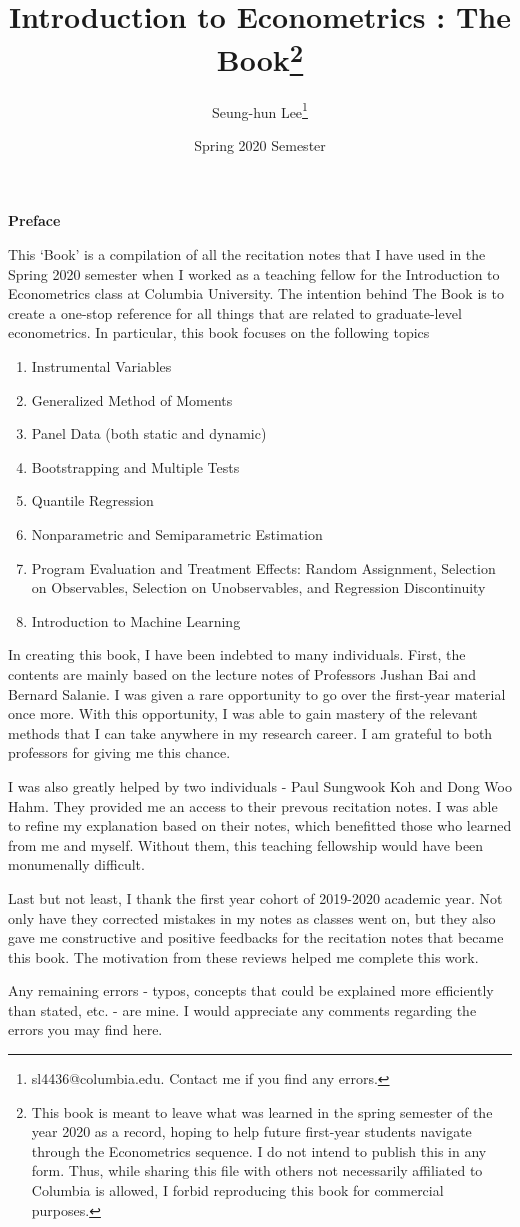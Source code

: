 \documentclass[12pt]{book}
\title{Introduction to Econometrics \ROM{2}: The Book\footnote{This book is meant to leave what was learned in the spring semester of the year 2020 as a record, hoping to help future first-year students navigate through the Econometrics sequence. I do not intend to publish this in any form. Thus, while sharing this file with others not necessarily affiliated to Columbia is allowed, I forbid reproducing this book for commercial purposes.}}
\date{Spring 2020 Semester}
\author{Seung-hun Lee\footnote{sl4436@columbia.edu. Contact me if you find any errors. }}
\theoremstyle{definition}
\theoremstyle{property}
\theoremstyle{assumption}
\theoremstyle{example}
\theoremstyle{comment}
\newcommand{\ROM}[1]
    {\MakeUppercase{\romannumeral #1}}
\newcommand{\prefacename}{Preface}
\newenvironment{preface}{
        \vspace*{\stretch{2}}
        {\noindent \bfseries \Huge \prefacename}
        \begin{center}
            \thispagestyle{plain}
        \end{center}%
    }
    {\vspace*{\stretch{5}}}
\begin{document}
\linespread{1.25}
\onehalfspacing
\maketitle
\pagestyle{empty}

\frontmatter
{}

\begin{preface}
This `Book' is a compilation of all the recitation notes that I have used in the Spring 2020 semester when I worked as a teaching fellow for the Introduction to Econometrics \ROM{2} class at Columbia University. The intention behind The Book is to create a one-stop reference for all things that are related to graduate-level econometrics.  In particular, this book focuses on the following topics
\begin{enumerate}
\item Instrumental Variables
\item Generalized Method of Moments
\item Panel Data (both static and dynamic)
\item Bootstrapping and Multiple Tests
\item Quantile Regression
\item Nonparametric and Semiparametric Estimation
\item Program Evaluation and Treatment Effects: Random Assignment, Selection on Observables, Selection on Unobservables, and Regression Discontinuity
\item Introduction to Machine Learning
\end{enumerate}
\par
In creating this book, I have been indebted to many individuals. First, the contents are mainly based on the lecture notes of Professors Jushan Bai and Bernard Salanie. I was given a rare opportunity to go over the first-year material once more. With this opportunity, I was able to gain mastery of the relevant methods that I can take anywhere in my research career. I am grateful to both professors for giving me this chance. 
\par
I was also greatly helped by two individuals - Paul Sungwook Koh and Dong Woo Hahm. They provided me an access to their prevous recitation notes. I was able to refine my explanation based on their notes, which benefitted those who learned from me and myself. Without them, this teaching fellowship would have been monumenally difficult. 
\par
Last but not least, I thank the first year cohort of 2019-2020 academic year. Not only have they corrected mistakes in my notes as classes went on, but they also gave me constructive and positive feedbacks for the recitation notes that became this book. The motivation from these reviews helped me complete this work. 
\par
Any remaining errors - typos, concepts that could be explained more efficiently than stated, etc. - are mine. I would appreciate any comments regarding the errors you may find here. \par

\end{preface}

\tableofcontents



\mainmatter
\pagestyle{fancy}











\end{document}
